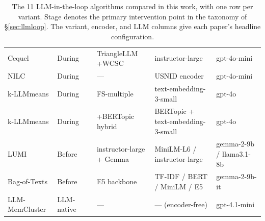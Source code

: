 \documentclass[11pt,a4paper,oneside]{report}
\begin{document}
\begin{table}[!htbp]
\begin{tabularx}{\textwidth}{@{}l l >{\raggedright\arraybackslash}p{2.7cm} >{\raggedright\arraybackslash}p{2.4cm} >{\raggedright\arraybackslash}X >{\raggedright\arraybackslash}X@{}}
Cequel              & During     & \citet{wang2025cequel}             & TriangleLLM +WCSC        & instructor-large                   & gpt-4o-mini \\
NILC                & During     & \citet{wang2025nilc}               & ---                      & USNID encoder                      & gpt-4o-mini \\
k-LLMmeans          & During     & \citet{diazrodriguez2026kllmmeans} & FS-multiple              & text-embedding-3-small             & gpt-4o \\
k-LLMmeans          & During     & \citet{diazrodriguez2026kllmmeans} & +BERTopic hybrid         & BERTopic + text-embedding-3-small  & gpt-4o \\
LUMI                & Before     & \citet{lin2025lumi}                & instructor-large + Gemma & MiniLM-L6 / instructor-large       & gemma-2-9b / llama3.1-8b \\
Bag-of-Texts        & Before     & \citet{lin2025bagoftexts}          & E5 backbone              & TF-IDF / BERT / MiniLM / E5        & gemma-2-9b-it \\
LLM-MemCluster      & LLM-native & \citet{zhu2025memcluster}          & ---                      & --- (encoder-free)               & gpt-4.1-mini \\
\bottomrule
\end{tabularx}
\caption[The LLM-in-the-loop algorithm roster]{The 11 LLM-in-the-loop algorithms compared in this work, with one row per variant. Stage denotes the primary intervention point in the taxonomy of \S\ref{sec:llmloop}. The variant, encoder, and LLM columns give each paper's headline configuration.}
\label{tab:roster}
\end{table}
\end{document}
